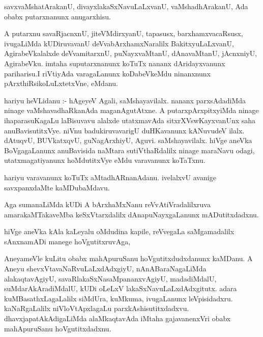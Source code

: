 \documentclass{article}
\begin{document}
\begin{mn}
savxvaMshatArakanU, divayxlakaSxNavuLaLxvanU, vaMshadhArakanU, Ada obabx putarxnanunx anugarxhisu.
\end{mn}

\begin{mn}
A putarxnu  savaRjacnxnU, jiteVMdirxyanU,  tapasusx, barxhamxvacaRsusx, 
ivugaLiMda kUDiruvavanU deVvabArxhamxNaralilx  BakitxyuLaLxvanU, AgirabeVkalalxde 
deVvamitarxnU, puNayxvaMtanU,  dAnavaMtanU,  jAcnxniyU, AgirabeVku.  imtaha 
suputarxnanunx koTuTx nananx  dAridayxvanunx pariharisu.I riVtiyAda varagaLanunx  
koDabeVkeMdu ninanxnunx pArxthiRsikoLuLxtetxVne, eMdanu.
\end{mn}

\begin{mn}
hariyu heVLidanu :- hAgeyeV  Agali,  saMshayavilalx.  nananx parxsAdadiMda  
ninage vaMshavadhaRkanAda maganAgutAtxne.  A  putarxpArxpitxyiMda  ninage 
ihaparasuKagaLu laBisuvavu  alalxde utatxmavAda  sitxrXVswKayxvanUnx  saha 
anuBavisutitxVye. niVnu  badukiruvavarigU duHKavanunx  kANuvudeV ilalx. 
dAtuqvU, BUVkatxqvU, guNagArxhiyU, Aguvi. saMshayavilalx.  hiVge aneVka 
BoVgagaLanunx anuBavisida naMtara sutiVthaRdalilx  ninage maraNavu odagi, 
utatxmagatiyanunx hoMdutitxVye  eMdu varavanunx koTaTxnu.
\end{mn}

\begin{mn}
hariyu varavanunx  koTuTx aMtadhARnanAdanu. ivelalxvU avanige savxpanxdaMte kaMDubaMdavu.
\end{mn}

\begin{mn}
Aga sumanaLiMda kUDi A bArxhaMxNanu reVvAtiVradalilxruva amarakaMTakaveMba 
keSxVtarxdalilx  dAnapuNayxgaLanunx mADutitxdadxnu.
\end{mn}

\begin{mn}
hiVge aneVka kAla kaLeyalu oMdudina kapile, reVvegaLa saMgamadalilx 
sAnxnamADi manege hoVgutitxruvAga,
\end{mn}

\begin{mn}
AneyameVle kuLitu obabx mahApuruSanu hoVgutitxdudxdanunx kaMDanu. A Aneyu  
shevxVtavaNaRvuLaLxdAdxgiyU, nAnABaraNagaLiMda alakaqtavAgiyU, 
savaRlakaSxNasaMpananxvAgiyU, madadiMdalU, suMdarAkAradiMdalU, kUDi oLeLxV  
lakaSxNavuLaLxdAdxgitutx. adara kuMBasathxLagaLalilx siMdUra, kuMkuma,  
ivugaLanunx leVpisidadxru. kaNaRgaLalilx niVloVtApxlagaLu parxkAshisutitxdadxvu. 
dhavxjapatAkAdigaLiMda  alaMkaqtavAda iMtaha gajavanenxVri obabx mahApuruSanu hoVgutitxdadxnu.
\end{mn}
\end{document}
